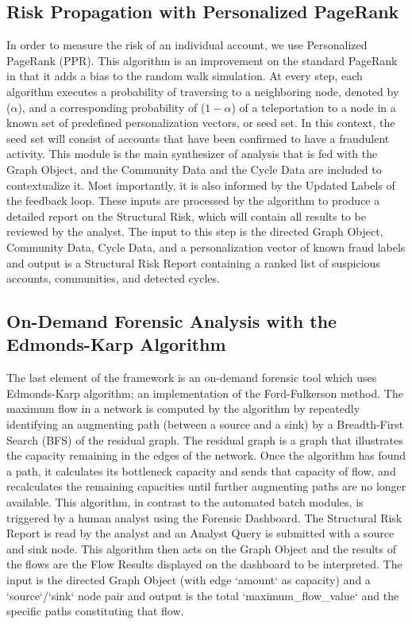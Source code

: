 \documentclass[lettersize,journal]{IEEEtran}
\begin{document}
\subsection{Risk Propagation with Personalized PageRank}
In order to measure the risk of an individual account, we use Personalized PageRank (PPR). This algorithm is an improvement on the standard PageRank in that it adds a bias to the random walk simulation. At every step, each algorithm executes a probability of traversing to a neighboring node, denoted by ($\alpha$), and a corresponding probability of ($1-\alpha$) of a teleportation to a node in a known set of predefined personalization vectors, or seed set. In this context, the seed set will consist of accounts that have been confirmed to have a fraudulent activity. This module is the main synthesizer of analysis that is fed with the Graph Object, and the Community Data and the Cycle Data are included to contextualize it. Most importantly, it is also informed by the Updated Labels of the feedback loop. These inputs are processed by the algorithm to produce a detailed report on the Structural Risk, which will contain all results to be reviewed by the analyst. The input to this step is the directed Graph Object, Community Data, Cycle Data, and a personalization vector of known fraud labels and output is a Structural Risk Report containing a ranked list of suspicious accounts, communities, and detected cycles.


\subsection{On-Demand Forensic Analysis with the Edmonds-Karp Algorithm}
The last element of the framework is an on-demand forensic tool which uses Edmonds-Karp algorithm; an implementation of the Ford-Fulkerson method. The maximum flow in a network is computed by the algorithm by repeatedly identifying an augmenting path (between a source and a sink) by a Breadth-First Search (BFS) of the residual graph. The residual graph is a graph that illustrates the capacity remaining in the edges of the network. Once the algorithm has found a path, it calculates its bottleneck capacity and sends that capacity of flow, and recalculates the remaining capacities until further augmenting paths are no longer available. This algorithm, in contrast to the automated batch modules, is triggered by a human analyst using the Forensic Dashboard. The Structural Risk Report is read by the analyst and an Analyst Query is submitted with a source and sink node. This algorithm then acts on the Graph Object and the results of the flows are the Flow Results displayed on the dashboard to be interpreted.
The input is the directed Graph Object (with edge `amount` as capacity) and a `source`/`sink` node pair and output is the total `maximum\_flow\_value` and the specific paths constituting that flow.
\end{document}
